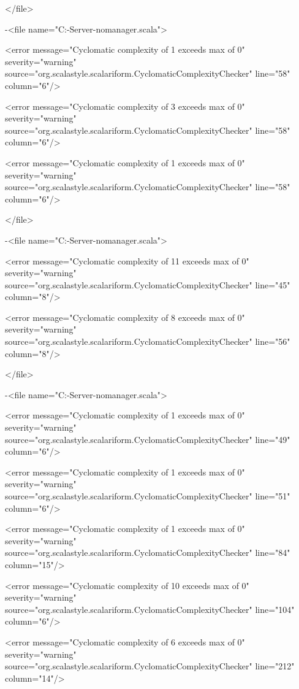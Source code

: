 \documentclass{scalatekids-article}
\begin{document}
</file>


-<file name="C:\Users\Davide\Desktop\Actorbase-Server-nomanager\src\main\scala\com\actorbase\actorsystem\clientactor\Authenticator.scala">

<error message="Cyclomatic complexity of 1 exceeds max of 0" severity="warning" source="org.scalastyle.scalariform.CyclomaticComplexityChecker" line="58" column="6"/>

<error message="Cyclomatic complexity of 3 exceeds max of 0" severity="warning" source="org.scalastyle.scalariform.CyclomaticComplexityChecker" line="58" column="6"/>

<error message="Cyclomatic complexity of 1 exceeds max of 0" severity="warning" source="org.scalastyle.scalariform.CyclomaticComplexityChecker" line="58" column="6"/>

</file>


-<file name="C:\Users\Davide\Desktop\Actorbase-Server-nomanager\src\main\scala\com\actorbase\actorsystem\clientactor\messages\Messages.scala">

<error message="Cyclomatic complexity of 11 exceeds max of 0" severity="warning" source="org.scalastyle.scalariform.CyclomaticComplexityChecker" line="45" column="8"/>

<error message="Cyclomatic complexity of 8 exceeds max of 0" severity="warning" source="org.scalastyle.scalariform.CyclomaticComplexityChecker" line="56" column="8"/>

</file>


-<file name="C:\Users\Davide\Desktop\Actorbase-Server-nomanager\src\main\scala\com\actorbase\actorsystem\storekeeper\Storekeeper.scala">

<error message="Cyclomatic complexity of 1 exceeds max of 0" severity="warning" source="org.scalastyle.scalariform.CyclomaticComplexityChecker" line="49" column="6"/>

<error message="Cyclomatic complexity of 1 exceeds max of 0" severity="warning" source="org.scalastyle.scalariform.CyclomaticComplexityChecker" line="51" column="6"/>

<error message="Cyclomatic complexity of 1 exceeds max of 0" severity="warning" source="org.scalastyle.scalariform.CyclomaticComplexityChecker" line="84" column="15"/>

<error message="Cyclomatic complexity of 10 exceeds max of 0" severity="warning" source="org.scalastyle.scalariform.CyclomaticComplexityChecker" line="104" column="6"/>

<error message="Cyclomatic complexity of 6 exceeds max of 0" severity="warning" source="org.scalastyle.scalariform.CyclomaticComplexityChecker" line="212" column="14"/>
\end{document}
